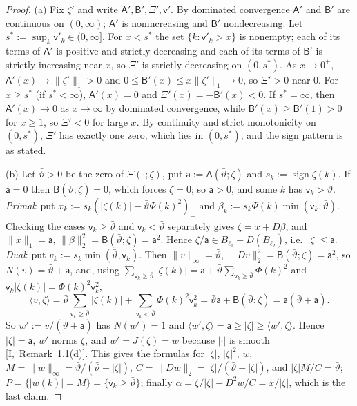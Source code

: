 \documentclass[10pt]{amsart}
\theoremstyle{definition}
\theoremstyle{remark}
\newcommand{\sgn}{\operatorname{sign}}
\newcommand{\ip}[2]{\langle #1,#2\rangle}
\begin{document}
\begin{proof}
(a) Fix $\zeta'$ and write $\mathsf A',\mathsf B',\Xi',\mathsf v'$.  By
dominated convergence $\mathsf A'$ and $\mathsf B'$ are continuous on
$(0,\infty)$; $\mathsf A'$ is nonincreasing and $\mathsf B'$ nondecreasing.
Let $s^*:=\sup_k\mathsf v'_k\in(0,\infty]$.  For $x<s^*$ the set
$\{k:\mathsf v'_k>x\}$ is nonempty; each of its terms of $\mathsf A'$ is
positive and strictly decreasing and each of its terms of $\mathsf B'$ is
strictly increasing near $x$, so $\Xi'$ is strictly decreasing on
$(0,s^*)$.  As $x\to0^+$, $\mathsf A'(x)\to\|\zeta'\|_1>0$ and $0\le\mathsf
B'(x)\le x\|\zeta'\|_1\to0$, so $\Xi'>0$ near $0$.  For $x\ge s^*$ (if
$s^*<\infty$), $\mathsf A'(x)=0$ and $\Xi'(x)=-\mathsf B'(x)<0$.  If
$s^*=\infty$, then $\mathsf A'(x)\to0$ as $x\to\infty$ by dominated
convergence, while $\mathsf B'(x)\ge\mathsf B'(1)>0$ for $x\ge1$, so $\Xi'<0$
for large $x$.  By continuity and strict monotonicity on $(0,s^*)$,
$\Xi'$ has exactly one zero, which lies in $(0,s^*)$, and the sign
pattern is as stated.

(b) Let $\bar\vartheta>0$ be the zero of $\Xi(\cdot;\zeta)$, put $\mathsf
a:=\mathsf A(\bar\vartheta;\zeta)$ and $s_k:=\sgn\zeta(k)$.  If $\mathsf a=0$
then $\mathsf B(\bar\vartheta;\zeta)=0$, which forces $\zeta=0$; so $\mathsf
a>0$, and some $k$ has $\mathsf v_k>\bar\vartheta$.  \emph{Primal}: put
$x_k:=s_k(|\zeta(k)|-\bar\vartheta\Phi(k)^2)_+$ and $\beta_k:=s_k\Phi(k)
\min(\mathsf v_k,\bar\vartheta)$.  Checking the cases $\mathsf v_k\ge
\bar\vartheta$ and $\mathsf v_k<\bar\vartheta$ separately gives
$\zeta=x+D\beta$, and $\|x\|_1=\mathsf a$, $\|\beta\|_2^2=\mathsf
B(\bar\vartheta;\zeta)=\mathsf a^2$.  Hence $\zeta/\mathsf a\in B_{\ell_1}+
D(B_{\ell_2})$, i.e.\ $|\zeta|\le\mathsf a$.  \emph{Dual}: put
$v_k:=s_k\min(\bar\vartheta,\mathsf v_k)$.  Then $\|v\|_\infty=\bar\vartheta$,
$\|Dv\|_2^2=\mathsf B(\bar\vartheta;\zeta)=\mathsf a^2$, so $N(v)=\bar\vartheta+
\mathsf a$, and, using $\sum_{\mathsf v_k\ge\bar\vartheta}|\zeta(k)|=\mathsf
a+\bar\vartheta\sum_{\mathsf v_k\ge\bar\vartheta}\Phi(k)^2$ and $\mathsf
v_k|\zeta(k)|=\Phi(k)^2\mathsf v_k^2$,
\[
 \ip{v}{\zeta}=\bar\vartheta\sum_{\mathsf v_k\ge\bar\vartheta}|\zeta(k)|+
 \sum_{\mathsf v_k<\bar\vartheta}\Phi(k)^2\mathsf v_k^2=\bar\vartheta\mathsf a
 +\mathsf B(\bar\vartheta;\zeta)=\mathsf a(\bar\vartheta+\mathsf a).
\]
So $w':=v/(\bar\vartheta+\mathsf a)$ has $N(w')=1$ and $\ip{w'}{\zeta}=\mathsf
a\ge|\zeta|\ge\ip{w'}{\zeta}$.  Hence $|\zeta|=\mathsf a$, $w'$ norms $\zeta$,
and $w'=J(\zeta)=w$ because $|\cdot|$ is smooth [I,~Remark~1.1(d)].  This
gives the formulas for $|\zeta|$, $|\zeta|^2$, $w$, $M=\|w\|_\infty=
\bar\vartheta/(\bar\vartheta+|\zeta|)$, $C=\|Dw\|_2=|\zeta|/(\bar\vartheta+
|\zeta|)$, and $|\zeta|M/C=\bar\vartheta$; $P=\{|w(k)|=M\}=\{\mathsf v_k\ge
\bar\vartheta\}$; finally $\alpha=\zeta/|\zeta|-D^2w/C=x/|\zeta|$, which is the
last claim.


\end{proof}
\end{document}
